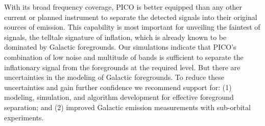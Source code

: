 \documentclass[PICOAPC.tex]{subfiles}
\begin{document}

With its broad frequency coverage, PICO is better equipped than any other current or planned instrument to separate the detected signals into their original sources of emission.  This capability is most important for unveiling the faintest of signals, the telltale signature of inflation, which is already known to be dominated by Galactic foregrounds. Our simulations indicate that PICO's combination of low noise and multitude of bands is sufficient to separate the inflationary signal from the foregrounds at the required level. But there are uncertainties in the modeling of Galactic foregrounds. To reduce these uncertainties and gain further confidence we recommend support for: (1) modeling, simulation, and algorithm development for effective foreground separation; and (2) improved Galactic emission measurements with sub-orbital experiments. 

\end{document}
